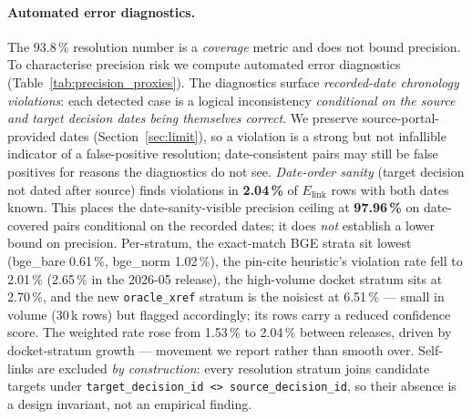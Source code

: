 \documentclass[11pt,a4paper]{article}
\begin{document}
\paragraph{Automated error diagnostics.} The 93.8\,\% resolution number is a \emph{coverage} metric and does not bound precision. To characterise precision risk we compute automated error diagnostics (Table~\ref{tab:precision_proxies}). The diagnostics surface \emph{recorded-date chronology violations}: each detected case is a logical inconsistency \emph{conditional on the source and target decision dates being themselves correct}. We preserve source-portal-provided dates (Section~\ref{sec:limit}), so a violation is a strong but not infallible indicator of a false-positive resolution; date-consistent pairs may still be false positives for reasons the diagnostics do not see. \emph{Date-order sanity} (target decision not dated after source) finds violations in \textbf{2.04\,\%} of $E_{\textrm{link}}$ rows with both dates known. This places the date-sanity-visible precision ceiling at \textbf{97.96\,\%} on date-covered pairs conditional on the recorded dates; it does \emph{not} establish a lower bound on precision. Per-stratum, the exact-match BGE strata sit lowest (bge\_bare 0.61\,\%, bge\_norm 1.02\,\%), the pin-cite heuristic's violation rate fell to 2.01\,\% (2.65\,\% in the 2026-05 release), the high-volume docket stratum sits at 2.70\,\%, and the new \texttt{oracle\_xref} stratum is the noisiest at 6.51\,\% --- small in volume (30\,k rows) but flagged accordingly; its rows carry a reduced confidence score. The weighted rate rose from 1.53\,\% to 2.04\,\% between releases, driven by docket-stratum growth --- movement we report rather than smooth over. Self-links are excluded \emph{by construction}: every resolution stratum joins candidate targets under \texttt{target\_decision\_id <> source\_decision\_id}, so their absence is a design invariant, not an empirical finding.


\FloatBarrier
\end{document}
